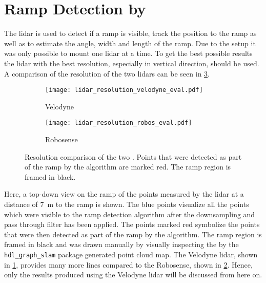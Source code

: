 \section{Ramp Detection by }
\label{sec:eval_lidar}
The \gls{lidar} is used to detect if a ramp is visible, track the position to the ramp as well as to estimate the angle, width and length of the ramp.
Due to the setup it was only possible to mount one \gls{lidar} at a time.
To get the best possible results the \gls{lidar} with the best resolution, especially in vertical direction, should be used.
A comparison of the resolution of the two \glspl{lidar} can be seen in \cref{fig:lidar_resolution_eval}.
\begin{figure}[htb]
    \centering
    \begin{subfigure}{1\textwidth}
        \centering
        \texttt{[image: lidar\_resolution\_velodyne\_eval.pdf]}
        \caption{Velodyne}
        \label{fig:lidar_resolution_velodyne_eval}
    \end{subfigure}
    
    \begin{subfigure}{1\textwidth}
        \centering
        \texttt{[image: lidar\_resolution\_robos\_eval.pdf]}
        \caption{Robosense}
        \label{fig:lidar_resolution_robos_eval}
    \end{subfigure}
    \caption[Resolution comparison of the two ]{Resolution comparison of the two . Points that were detected as part of the ramp by the algorithm are marked red. The ramp region is framed in black.}
    \label{fig:lidar_resolution_eval}
\end{figure}
Here, a top-down view on the ramp of the points measured by the \gls{lidar} at a distance of \SI{7}{\metre} to the ramp is shown.
The blue points visualize all the points which were visible to the ramp detection algorithm after the downsampling and pass through filter has been applied.
The points marked red symbolize the points that were then detected as part of the ramp by the algorithm.
The ramp region is framed in black and was drawn manually by visually inspecting the by the \texttt{hdl\_graph\_slam} package generated point cloud map.
The Velodyne \gls{lidar}, shown in \cref{fig:lidar_resolution_velodyne_eval}, provides many more lines compared to the Robosense, shown in \cref{fig:lidar_resolution_robos_eval}.
Hence, only the results produced using the Velodyne \gls{lidar} will be discussed from here on.

